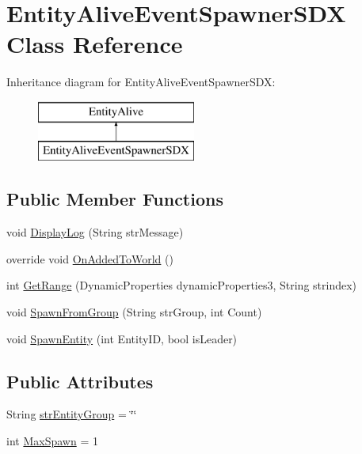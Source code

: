 \hypertarget{class_entity_alive_event_spawner_s_d_x}{}\section{Entity\+Alive\+Event\+Spawner\+S\+DX Class Reference}
\label{class_entity_alive_event_spawner_s_d_x}
Inheritance diagram for Entity\+Alive\+Event\+Spawner\+S\+DX\+:\begin{figure}[H]
\begin{center}
\leavevmode
\includegraphics[height=2.000000cm]{class_entity_alive_event_spawner_s_d_x}
\end{center}
\end{figure}
\subsection*{Public Member Functions}
\begin{DoxyCompactItemize}
\item 
void \mbox{\hyperlink{class_entity_alive_event_spawner_s_d_x_a20053d6a00c0c2dd83cdcdad3fdbe87b}{Display\+Log}} (String str\+Message)
\item 
override void \mbox{\hyperlink{class_entity_alive_event_spawner_s_d_x_a81514be912db66d9d18dce1214b162e2}{On\+Added\+To\+World}} ()
\item 
int \mbox{\hyperlink{class_entity_alive_event_spawner_s_d_x_a1338080eabbcf5fdd0369097aabe828e}{Get\+Range}} (Dynamic\+Properties dynamic\+Properties3, String strindex)
\item 
void \mbox{\hyperlink{class_entity_alive_event_spawner_s_d_x_a7014f1a45b9a4f2b239fe07f767bc289}{Spawn\+From\+Group}} (String str\+Group, int Count)
\item 
void \mbox{\hyperlink{class_entity_alive_event_spawner_s_d_x_a423f31528771f8cda65bff9d3c76a0b1}{Spawn\+Entity}} (int Entity\+ID, bool is\+Leader)
\end{DoxyCompactItemize}
\subsection*{Public Attributes}
\begin{DoxyCompactItemize}
\item 
String \mbox{\hyperlink{class_entity_alive_event_spawner_s_d_x_aa0c5f7cbfca5d300657cb4b4a45c06bd}{str\+Entity\+Group}} = \char`\"{}\char`\"{}
\item 
int \mbox{\hyperlink{class_entity_alive_event_spawner_s_d_x_ad51ed67c4e3d72c8d056f0a4ded3df1b}{Max\+Spawn}} = 1
\end{DoxyCompactItemize}


